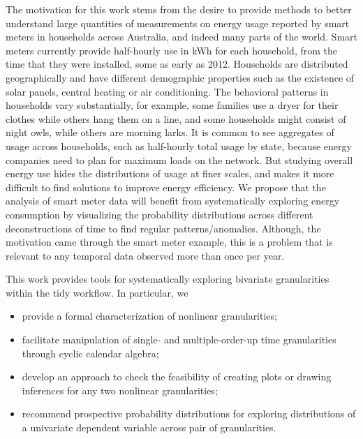 \documentclass[12pt]{article}
\providecommand{\tightlist}{%
  \setlength{\itemsep}{0pt}\setlength{\parskip}{0pt}}
\begin{document}
The motivation for this work stems from the desire to provide methods to better understand large quantities of measurements on energy usage reported by smart meters in households across Australia, and indeed many parts of the world. Smart meters currently provide half-hourly use in kWh for each household, from the time that they were installed, some as early as 2012. Households are distributed geographically and have different demographic properties such as the existence of solar panels, central heating or air conditioning. The behavioral patterns in households vary substantially, for example, some families use a dryer for their clothes while others hang them on a line, and some households might consist of night owls, while others are morning larks. It is common to see aggregates \citep[see][]{2012-la} of usage across households, such as half-hourly total usage by state, because energy companies need to plan for maximum loads on the network. But studying overall energy use hides the distributions of usage at finer scales, and makes it more difficult to find solutions to improve energy efficiency. We propose that the analysis of smart meter data will benefit from systematically exploring energy consumption by visualizing the probability distributions across different deconstructions of time to find regular patterns/anomalies. Although, the motivation came through the smart meter example, this is a problem that is relevant to any temporal data observed more than once per year.

This work provides tools for systematically exploring bivariate granularities within the tidy workflow. In particular, we

\begin{itemize}
\tightlist
\item
  provide a formal characterization of nonlinear granularities;
\item
  facilitate manipulation of single- and multiple-order-up time granularities through cyclic calendar algebra;
\item
  develop an approach to check the feasibility of creating plots or drawing inferences for any two nonlinear granularities;
\item
  recommend prospective probability distributions for exploring distributions of a univariate dependent variable across pair of granularities.
\end{itemize}
\end{document}
